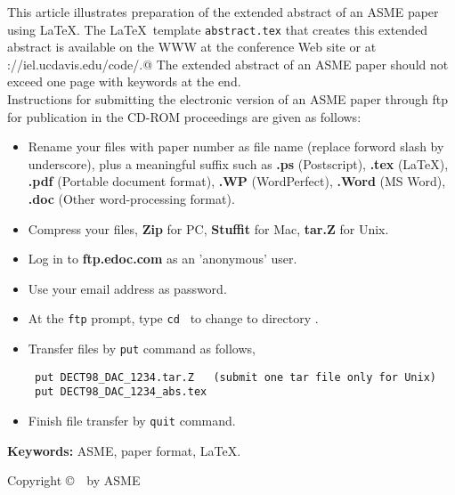 \vspace{22pt}
{\footnotesize{\tir
This article illustrates preparation of the extended abstract of
an ASME paper using \LaTeX.
The \LaTeX\  template \verb+abstract.tex+
that creates this extended abstract is available on the WWW at
the conference Web site 
or at \verb@http://iel.ucdavis.edu/code/.@
The extended abstract of an ASME paper should not exceed one page
with keywords at the end.\\

Instructions for submitting the electronic version of 
an ASME paper through ftp for publication in the CD-ROM proceedings 
are given as follows:
\begin{itemize}
\item
Rename your files with paper number as file name (replace forword slash by underscore), 
plus a meaningful
suffix such as {\bf .ps} (Postscript), 
{\bf .tex} (\LaTeX),
{\bf .pdf} (Portable document format),
{\bf .WP} (WordPerfect),
{\bf .Word} (MS Word),
{\bf .doc} (Other word-processing format).
\item
Compress your files, {\bf Zip} for PC, {\bf Stuffit} for Mac, {\bf tar.Z} for Unix.
\item
Log in to {\bf ftp.edoc.com} as an 'anonymous' user.
\item
Use your email address as password.
\item
At the {\tt ftp} prompt, type {\tt cd \confshortname} to change to directory {\tt \confshortname}.
\item
Transfer files by {\tt put} command as follows,
\begin{verbatim}
 put DECT98_DAC_1234.tar.Z   (submit one tar file only for Unix)
 put DECT98_DAC_1234_abs.tex
\end{verbatim}
\item
Finish file transfer by {\tt quit} command.
\end{itemize}


\vspace{10pt}
{\bf Keywords:} ASME, paper format, \LaTeX.


}}

\vspace{\fill}
{\scriptsize{\hv
\begin{flushbottom}
\begin{flushright}
Copyright \copyright\ \confyear\ by ASME
\end{flushright}
\end{flushbottom}
}}



